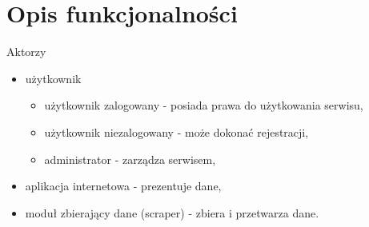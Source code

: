 \documentclass[12pt, titlepage]{article}
\begin{document}
	\section{Opis funkcjonalności}
	{\large Aktorzy
	\begin{itemize}
		\item użytkownik
			\begin{itemize}
				\item użytkownik zalogowany - posiada prawa do użytkowania serwisu,
				\item użytkownik niezalogowany - może dokonać rejestracji,
				\item administrator - zarządza serwisem,
			\end{itemize}
		\item aplikacja internetowa - prezentuje dane,
		\item moduł zbierający dane (scraper) - zbiera i przetwarza dane.
	\end{itemize}}
	\setlength\extrarowheight{10pt}
\end{document}
